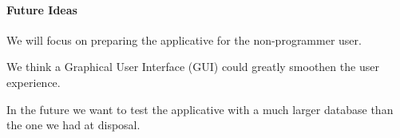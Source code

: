 \documentclass[11pt,twocolumn]{article}
\begin{document}
\paragraph{Future Ideas}

We will focus on preparing the applicative for the non-programmer user.

We think a Graphical User Interface (GUI) could greatly smoothen the user experience.

In the future we want to test the applicative with a much larger database than the one we had at disposal.

\twocolumn[
\begin{@twocolumnfalse}


\end{@twocolumnfalse}
]
\end{document}
